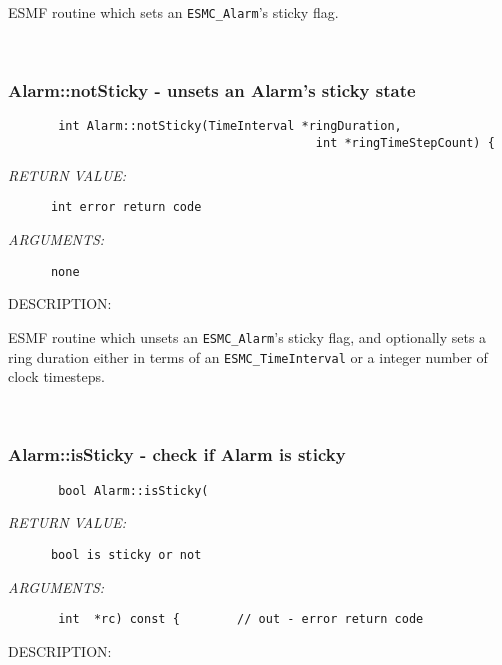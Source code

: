         ESMF routine which sets an {\tt ESMC\_Alarm}'s sticky flag.
   
 
\mbox{}\hrulefill\ 
 
\subsubsection [Alarm::notSticky] {Alarm::notSticky - unsets an Alarm's sticky state }


  
\begin{verbatim}       int Alarm::notSticky(TimeInterval *ringDuration,
                                           int *ringTimeStepCount) {\end{verbatim}{\em RETURN VALUE:}
\begin{verbatim}      int error return code\end{verbatim}{\em ARGUMENTS:}
\begin{verbatim}      none\end{verbatim}
{\sf DESCRIPTION:\\ }


        ESMF routine which unsets an {\tt ESMC\_Alarm}'s sticky flag,
        and optionally sets a ring duration either in terms of an
        {\tt ESMC\_TimeInterval} or a integer number of clock timesteps.
   
 
\mbox{}\hrulefill\ 
 
\subsubsection [Alarm::isSticky] {Alarm::isSticky - check if Alarm is sticky}


  
\begin{verbatim}       bool Alarm::isSticky(\end{verbatim}{\em RETURN VALUE:}
\begin{verbatim}      bool is sticky or not\end{verbatim}{\em ARGUMENTS:}
\begin{verbatim}       int  *rc) const {        // out - error return code\end{verbatim}
{\sf DESCRIPTION:\\ }


